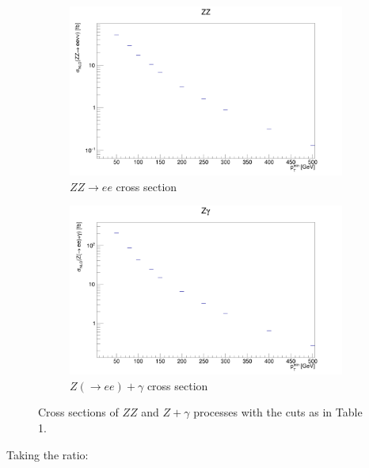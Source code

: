 \documentclass[11pt,a4paper,final]{report}
\begin{document}
\begin{figure}[H]
\centering
	\begin{subfigure}{0.49\textwidth}
		\includegraphics[width=\linewidth]{ZZ_xsec.png}
		\caption{$ZZ\rightarrow ee$ cross section}
	\end{subfigure}	
	\begin{subfigure}{0.49\textwidth}
		\includegraphics[width=\linewidth]{Zg_xsec.png}
		\caption{$Z(\rightarrow ee)+\gamma$ cross section}
	\end{subfigure}
	
	\caption{Cross sections of $ZZ$ and $Z+\gamma$ processes with the cuts as in Table 1.}
\end{figure}
\newpage
Taking the ratio:
\end{document}
